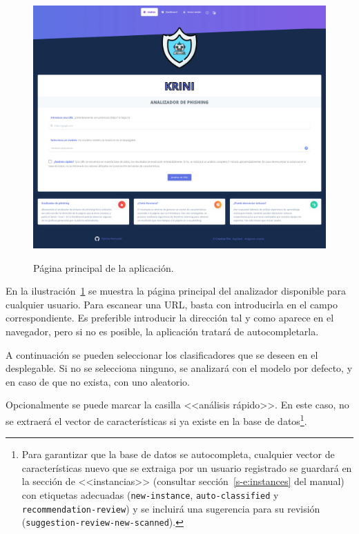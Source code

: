 \begin{figure}[h]
	\caption[Manual de usuario: página principal]{Página principal de la aplicación.}
	\centering
	\includegraphics[width=\textwidth]{../img/anexos/user_guide/1_index}
	\label{e-1:index}
\end{figure}

En la ilustración~\ref{e-1:index} se muestra la página principal del analizador disponible para cualquier usuario. Para escanear una URL, basta con introducirla en el campo correspondiente. Es preferible introducir la dirección tal y como aparece en el navegador, pero si no es posible, la aplicación tratará de autocompletarla.

A continuación se pueden seleccionar los clasificadores que se deseen en el desplegable. Si no se selecciona ninguno, se analizará con el modelo por defecto, y en caso de que no exista, con uno aleatorio.

Opcionalmente se puede marcar la casilla <<análisis rápido>>. En este caso, no se extraerá el vector de características si ya existe en la base de datos\footnote{Para garantizar que la base de datos se autocompleta, cualquier vector de características nuevo que se extraiga por un usuario registrado se guardará en la sección de <<instancias>> (consultar sección~\ref{s-e:instances} del manual) con etiquetas adecuadas (\texttt{new-instance}, \texttt{auto-classified} y \texttt{recommendation-review}) y se incluirá una sugerencia para su revisión (\texttt{suggestion-review-new-scanned}).}.
 
